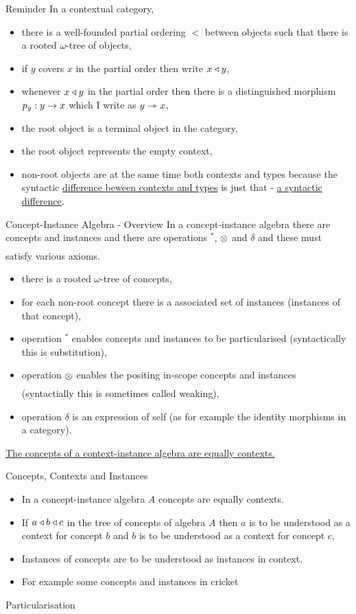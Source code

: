 \begin{frame}{Reminder}
In a contextual category,
\begin{itemize}
\item there is a well-founded partial ordering $<$ between objects
such that there is  a rooted $\omega$-tree of objects,
\item if $y$ covers $x$ in the partial order then write $x \triangleleft y$,
\item whenever $x \triangleleft y$ in the partial order then there is a distinguished
morphism $p_y:y \rightarrow x$ which I write as $y \rightarrowtriangle x$,
\item the root object is a terminal object in the category,
\item the root object represents the empty context, 
\item non-root objects are at the same time both contexts and types
because the syntactic \underline{difference beween contexts and types} is 
just that - \underline{a syntactic difference}. 
\end{itemize}
\end{frame}

\begin{frame}{Concept-Instance Algebra -  Overview}
In a concept-instance algebra there are concepts and instances and there are operations $^*$, $\underset{}{\otimes}$ and $\delta$
and these must satisfy various axioms.
\begin{itemize}
\item there is a rooted $\omega$-tree of concepts,
\item for each non-root concept there is a associated set of instances (instances of that concept),
\item operation $^*$ enables  concepts and instances to be particularised (syntactically this is substitution),
\item  operation $\underset{}{\otimes}$ enables the positing in-scope concepts and instances (syntactially this is sometimes called weaking),
\item operation $\delta$ is an expression of self (as for example the identity morphisms in a category).
\end{itemize}
\underline{The concepts of a context-instance algebra are equally contexts.}
\end{frame}

\begin{frame}{Concepts, Contexts  and Instances}
\begin{itemize}
\item In a concept-instance algebra $A$ concepts are equally contexts.
\item If $a \triangleleft b \triangleleft c$ in the tree of concepts of algebra $A$ 
then $a$ is to be understood as a context for concept $b$ and $b$ is to be understood as a context for concept $c$,
\item Instances of concepts are to be understood as instances in context.
\item For example some concepts and instances in cricket

\end{itemize} 
\end{frame}

\begin{frame}{Particularisation}


\end{frame}



